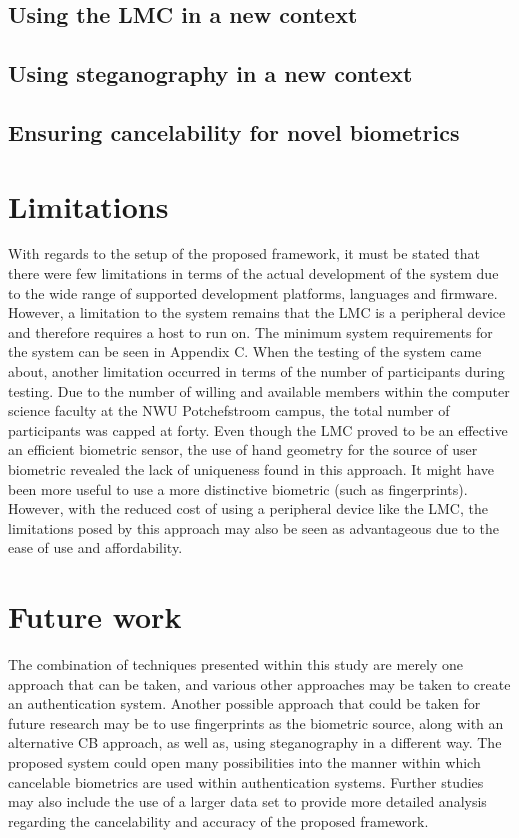 \subsection{Using the LMC in a new context}

\subsection{Using steganography in a new context}

\subsection{Ensuring cancelability for novel biometrics}

\section{Limitations}

With regards to the setup of the proposed framework, it must be stated that there were few limitations in terms of the actual development of the system due to the wide range of supported development platforms, languages and firmware. However, a limitation to the system remains that the LMC is a peripheral device and therefore requires a host to run on. The minimum system requirements for the system can be seen in Appendix C.
When the testing of the system came about, another limitation occurred in terms of the number of participants during testing. Due to the number of willing and available members within the computer science faculty at the NWU Potchefstroom campus, the total number of participants was capped at forty. 
Even though the LMC proved to be an effective an efficient biometric sensor, the use of hand geometry for the source of user biometric revealed the lack of uniqueness found in this approach. It might have been more useful to use a more distinctive biometric (such as fingerprints). However, with the reduced cost of using a peripheral device like the LMC, the limitations posed by this approach may also be seen as advantageous due to the ease of use and affordability.

\section{Future work}

The combination of techniques presented within this study are merely one approach that can be taken, and various other approaches may be taken to create an authentication system. Another possible approach that could be taken for future research may be to use fingerprints as the biometric source, along with an alternative CB approach, as well as, using steganography in a different way. The proposed system could open many possibilities into the manner within which cancelable biometrics are used within authentication systems.
Further studies may also include the use of a larger data set to provide more detailed analysis regarding the cancelability and accuracy of the proposed framework.

